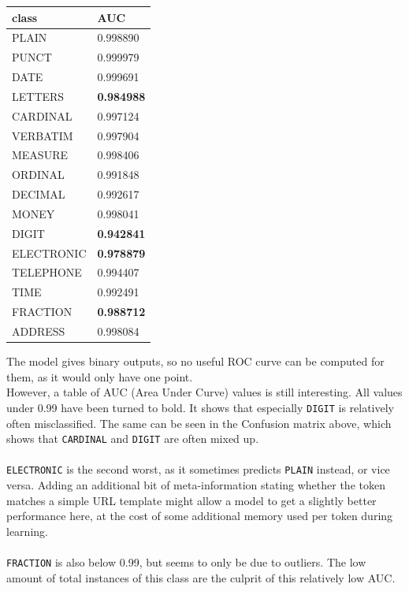 \documentclass[a4paper, 9pt]{extarticle}
\newcommand{\code}{\texttt}
\begin{document}
\begin{minipage}{0.35\textwidth}
\begin{tabular}{l|l}
\textbf{class}&\textbf{AUC}\\ \hline  
PLAIN       & 0.998890\\ \hline  
PUNCT       & 0.999979\\ \hline  
DATE        & 0.999691\\ \hline  
LETTERS     & \textbf{0.984988}\\\hline
CARDINAL    & 0.997124\\\hline
VERBATIM    & 0.997904\\\hline
MEASURE     & 0.998406\\\hline
ORDINAL     & 0.991848\\\hline
DECIMAL     & 0.992617\\\hline
MONEY       & 0.998041\\\hline
DIGIT       & \textbf{0.942841}\\\hline
ELECTRONIC  & \textbf{0.978879}\\\hline
TELEPHONE   & 0.994407\\\hline
TIME        & 0.992491\\\hline
FRACTION    & \textbf{0.988712}\\\hline
ADDRESS     & 0.998084\\
\end{tabular}
\end{minipage}%
\begin{minipage}{0.615\textwidth}
The model gives binary outputs, so no useful ROC curve can be computed for them, as it would only have one point.\\
However, a table of AUC (Area Under Curve) values is still interesting. All values under 0.99 have been turned to bold. It shows that especially \code{DIGIT} is relatively often misclassified. The same can be seen in the Confusion matrix above, which shows that \code{CARDINAL} and \code{DIGIT} are often mixed up.\\
\\
\code{ELECTRONIC} is the second worst, as it sometimes predicts \code{PLAIN} instead, or vice versa. Adding an additional bit of meta-information stating whether the token matches a simple URL template might allow a model to get a slightly better performance here, at the cost of some additional memory used per token during learning.\\
\\
\code{FRACTION} is also below 0.99, but seems to only be due to outliers. The low amount of total instances of this class are the culprit of this relatively low AUC.\\
\end{minipage}\\\\
\end{document}
